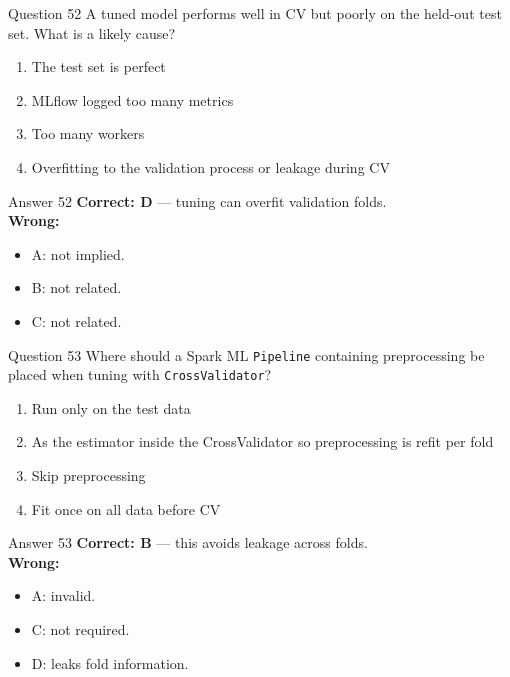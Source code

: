 \documentclass[aspectratio=169,11pt]{beamer}
\begin{document}
\begin{frame}{Question 52}
A tuned model performs well in CV but poorly on the held-out test set. What is a likely cause?
\begin{enumerate}[label=\Alph*.]
\item The test set is perfect
\item MLflow logged too many metrics
\item Too many workers
\item Overfitting to the validation process or leakage during CV
\end{enumerate}
\end{frame}
\begin{frame}{Answer 52}
\textbf{Correct: D} --- tuning can overfit validation folds.\\
\vspace{0.5em}
\textbf{Wrong:}
\begin{itemize}
\item A: not implied.
\item B: not related.
\item C: not related.
\end{itemize}
\end{frame}

\begin{frame}{Question 53}
Where should a Spark ML \texttt{Pipeline} containing preprocessing be placed when tuning with \texttt{CrossValidator}?
\begin{enumerate}[label=\Alph*.]
\item Run only on the test data
\item As the estimator inside the CrossValidator so preprocessing is refit per fold
\item Skip preprocessing
\item Fit once on all data before CV
\end{enumerate}
\end{frame}
\begin{frame}{Answer 53}
\textbf{Correct: B} --- this avoids leakage across folds.\\
\vspace{0.5em}
\textbf{Wrong:}
\begin{itemize}
\item A: invalid.
\item C: not required.
\item D: leaks fold information.
\end{itemize}
\end{frame}
\end{document}
